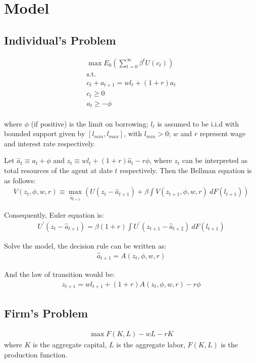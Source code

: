 \documentclass[]{article}
\begin{document}
\section{Model}
\subsection{Individual's Problem}

\begin{align}
	\max E_0\left(\sum_{t=0}^\infty \beta^t U(c_t)\right)\\
	\text{s.t.}\\
	c_t+a_{t+1}=wl_{t}+(1+r)a_t \\
	c_t\geq0\\
	a_t\geq-\phi
\end{align} \\
where $\phi$ (if positive) is the limit on borrowing; $l_t$ is assumed to be i.i.d with bounded support given by $[l_{min},l_{max}]$, with $l_{min}>0$; $w$ and $r$ represent wage and interest rate respectively.

Let $\hat{a}_t \equiv a_t+\phi$ and $z_t \equiv wl_t+(1+r)\hat{a}_t-r\phi$, where $z_t$ can be interpreted as total resources of the agent at date $t$ respectively. 
Then the Bellman equation is as follows:
\begin{align}
V(z_t,\phi,w,r) \equiv \underset{\hat{a}_{t+1}}{\max}\left(U(z_t-\hat{a}_{t+1})+\beta \int V(z_{t+1},\phi,w,r)\ dF(l_{t+1})  \right)
\end{align}

Consequently, Euler equation is: 
\begin{align}
	U^\prime (z_t-\hat{a}_{t+1})=\beta(1+r)\int U^\prime (z_{t+1}-\hat{a}_{t+2})\ dF(l_{t+1})
\end{align}

Solve the model, the decision rule can be written as: 
\begin{align}
	\hat{a}_{t+1}=A(z_t,\phi,w,r)
\end{align}

And the law of transition would be:
\begin{align}
	z_{t+1}=wl_{t+1}+(1+r)A(z_t,\phi,w,r)-r\phi
\end{align}

\subsection{Firm's Problem}
\begin{align}
	\max F(K,L)-wL-rK
\end{align}
where $K$ is the aggregate capital, $L$ is the aggregate labor, $F(K,L)$ is the production function.
\end{document}
